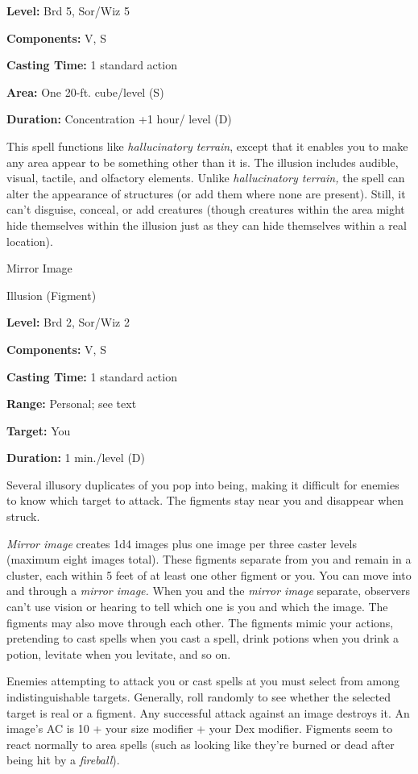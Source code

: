 \documentclass{article}
\begin{document}
\textbf{Level:} Brd 5, Sor/Wiz 5

\textbf{Components:} V, S

\textbf{Casting Time:} 1 standard action

\textbf{Area:} One 20-ft. cube/level (S)

\textbf{Duration:} Concentration +1 hour/ level (D)

This spell functions like \textit{hallucinatory terrain}, except that it enables 
you to make any area appear to be something other than it is. The illusion includes 
audible, visual, tactile, and olfactory elements. Unlike \textit{hallucinatory 
terrain, }the spell can alter the appearance of structures (or add them where none 
are present). Still, it can't disguise, conceal, or add creatures (though creatures 
within the area might hide themselves within the illusion just as they can hide 
themselves within a real location).

\vspace{12pt}
Mirror Image

Illusion (Figment)

\textbf{Level:} Brd 2, Sor/Wiz 2

\textbf{Components:} V, S

\textbf{Casting Time:} 1 standard action

\textbf{Range:} Personal; see text

\textbf{Target:} You

\textbf{Duration:} 1 min./level (D)

Several illusory duplicates of you pop into being, making it difficult for enemies 
to know which target to attack. The figments stay near you and disappear when struck.

\textit{Mirror image }creates 1d4 images plus one image per three caster levels 
(maximum eight images total). These figments separate from you and remain in a 
cluster, each within 5 feet of at least one other figment or you. You can move 
into and through a \textit{mirror image. }When you and the \textit{mirror image 
}separate, observers can't use vision or hearing to tell which one is you and which 
the image. The figments may also move through each other. The figments mimic your 
actions, pretending to cast spells when you cast a spell, drink potions when you 
drink a potion, levitate when you levitate, and so on.

Enemies attempting to attack you or cast spells at you must select from among indistinguishable 
targets. Generally, roll randomly to see whether the selected target is real or 
a figment. Any successful attack against an image destroys it. An image's AC is 
10 + your size modifier + your Dex modifier. Figments seem to react normally to 
area spells (such as looking like they're burned or dead after being hit by a \textit{fireball}).
\end{document}
